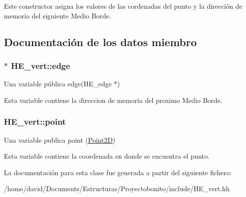 Este constructor asigna los valores de las cordenadas del punto y la dirección de memoria del siguiente Medio Borde. 

\subsection{Documentación de los datos miembro}
\hypertarget{class_h_e__vert_aec66f48f9a8d4e687f0d4a84d961ef9e}{
\subsubsection[{edge}]{$\ast$ H\-E\-\_\-vert\-::edge}}\label{class_h_e__vert_aec66f48f9a8d4e687f0d4a84d961ef9e}


Una variable pública edge(\-H\-E\-\_\-edge $\ast$) 

Esta variable contiene la direccion de memoria del proximo Medio Borde. \hypertarget{class_h_e__vert_af9f502918fbb0d79d4ed99ade0e8daea}{
\subsubsection[{point}]{ H\-E\-\_\-vert\-::point}}\label{class_h_e__vert_af9f502918fbb0d79d4ed99ade0e8daea}


Una variable publica point (\hyperlink{class_point2_d}{Point2\-D}) 

Esta variable contiene la coordenada en donde se encuentra el punto. 

La documentación para esta clase fue generada a partir del siguiente fichero\-:\begin{DoxyCompactItemize}
\item 
/home/david/\-Documents/\-Estructuras/\-Proyectobonito/include/H\-E\-\_\-vert.\-hh\end{DoxyCompactItemize}
